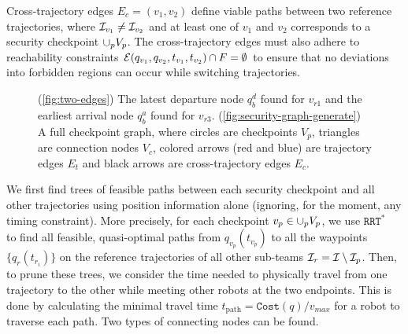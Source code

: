 \documentclass[10pt,twocolumn,twoside]{IEEEtran}
\newcommand{\rrtstar}{$\texttt{RRT}^\texttt{*}$}
\begin{document}
Cross-trajectory edges $E_c = (v_1, v_2)$ define viable paths between two reference trajectories, where $\mathcal{I}_{v_1}\neq\mathcal{I}_{v_2}$ and at least one of $v_1 $ and $v_2$ corresponds to a security checkpoint $\cup_p V_p$. The cross-trajectory edges must also adhere to reachability constraints $\mathcal{E}(q_{v_1}, q_{v_2}, t_{v_1},t_{v_2}) \cap F = \emptyset$ to ensure that no deviations into forbidden regions can occur  while switching trajectories.

\begin{figure}[htbp]
    \centering
  \caption{ (\ref{fig:two-edges}) The latest departure node $q^{d}_{b}$ found for $v_{r1}$ and the earliest arrival node $q^{a}_{b}$ found for $v_{r3}$. (\ref{fig:security-graph-generate}) A full checkpoint graph, where circles are checkpoints $V_p$, triangles are connection nodes $V_c$, colored arrows (red and blue) are trajectory edges $E_t$ and black arrows are cross-trajectory edges $E_c$.}
\end{figure}

We first find trees of feasible paths between each security checkpoint and all other trajectories using position information alone (ignoring, for the moment, any timing constraint). 
More precisely, for each checkpoint $v_p \in \cup_p V_p$, we use \rrtstar~ to find all feasible, quasi-optimal paths from $q_{v_p}(t_{v_p})$ to all the waypoints $\{q_{r}(t_{{r}_{i}})\}$ on the reference trajectories of all other sub-teams $\mathcal{I}_{r} = \mathcal{I} \setminus \mathcal{I}_{p}$.
Then, to prune these trees, we consider the time needed to physically travel from one trajectory to the other while meeting other robots at the two endpoints. This is done by calculating the minimal travel time $t_{\textrm{path}}=\texttt{Cost}(q)/v_{max}$ for a robot to traverse each path. Two types of connecting nodes can be found.
\end{document}
